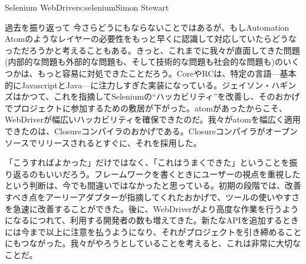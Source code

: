 \begin{aosachapter}{Selenium WebDriver}{s:selenium}{Simon Stewart}
\begin{aosasect1}{過去を振り返って}
今さらどうにもならないことではあるが、もしAutomation Atomのようなレイヤーの必要性をもっと早くに認識して対応していたらどうなっただろうかと考えることもある。きっと、これまでに我々が直面してきた問題(内部的な問題も外部的な問題も、そして技術的な問題も社会的な問題も)のいくつかは、もっと容易に対処できたことだろう。CoreやRCは、特定の言語---基本的にJavascriptとJava---に注力しすぎた実装になっている。ジェイソン・ハギンズはかつて、これを指摘してSeleniumの``ハッカビリティ''を改善し、そのおかげでプロジェクトに参加するための敷居が下がった。atomがあったからこそ、WebDriverが幅広いハッカビリティを確保できたのだ。我々がatomを幅広く適用できたのは、Closureコンパイラのおかげである。Closureコンパイラがオープンソースでリリースされるとすぐに、それを採用した。

「こうすればよかった」だけではなく、「これはうまくできた」ということを振り返るのもいいだろう。フレームワークを書くときにユーザーの視点を重視したという判断は、今でも間違いではなかったと思っている。初期の段階では、改善すべき点をアーリーアダプターが指摘してくれたおかげで、ツールの使いやすさを急速に改善することができた。後に、WebDriverがより高度な作業を行うようになるにつれて、利用する開発者の数も増えてきた。新たなAPIを追加するときには今まで以上に注意を払うようになり、それがプロジェクトを引き締めることにもつながった。我々がやろうとしていることを考えると、これは非常に大切なことだ。


\end{aosasect1}
\end{aosachapter}
